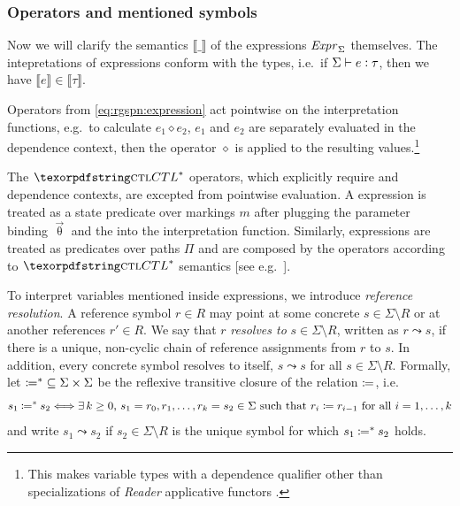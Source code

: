 \subsubsection{Operators and mentioned symbols}

Now we will clarify the semantics \(\llbracket \_ \rrbracket\) of the expressions \(\textrm{\itshape Expr\/}_\Sigma\) themselves. The intepretations of expressions conform with the types, i.e.~if \(\Sigma \vdash e \mathrel{\vcentcolon} \tau\), then we have \(\llbracket e \rrbracket \in \llbracket \tau \rrbracket\).

Operators from \vref{eq:rgspn:expression} act pointwise on the interpretation functions, e.g.~to calculate \(e_1 \mathbin{\diamond} e_2\), \(e_1\) and \(e_2\) are separately evaluated in the dependence context, then the operator \(\diamond\) is applied to the resulting values.\footnote{This makes variable types with a dependence qualifier other than  specializations of \emph{Reader} applicative functors .}

The \(\textabbr{CTL}^*\) operators, which explicitly require  and  dependence contexts, are excepted from pointwise evaluation. A  expression is treated as a state predicate over markings \(m\) after plugging the parameter binding \(\vec{\uptheta}\) and the  into the interpretation function. Similarly,  expressions are treated as predicates over paths \(\Pi\) and are composed by the operators according to \(\textabbr{CTL}^*\) semantics [see e.g.~].

To interpret variables mentioned inside expressions, we introduce \emph{reference resolution}. A reference symbol \(r \in R\) may point at some concrete \(s \in \Sigma \setminus R\) or at another references \(r' \in R\). We say that \(r\) \emph{resolves to} \(s \in \Sigma \setminus R\), written as \(r \leadsto s\), if there is a unique, non-cyclic chain of reference assignments from \(r\) to \(s\). In addition, every concrete symbol resolves to itself, \(s \leadsto s\) for all \(s \in \Sigma \setminus R\). Formally, let \({\coloneq^*} \subseteq \Sigma \times \Sigma\) be the reflexive transitive closure of the relation \(\coloneq\), i.e.
\begin{equation}
  s_1 \mathbin{\coloneq^*} s_2 \Longleftrightarrow \text{\(\exists\, k \ge 0\), \(s_1 = r_0, r_1, \ldots, r_k = s_2 \in \Sigma\) such that \(r_i \coloneq r_{i - 1}\) for all \(i = 1, \ldots, k\)}
\end{equation}
and write \(s_1 \leadsto s_2\) if \(s_2 \in \Sigma \setminus R\) is the unique symbol for which \(s_1 \mathbin{\coloneq^*} s_2\) holds.

